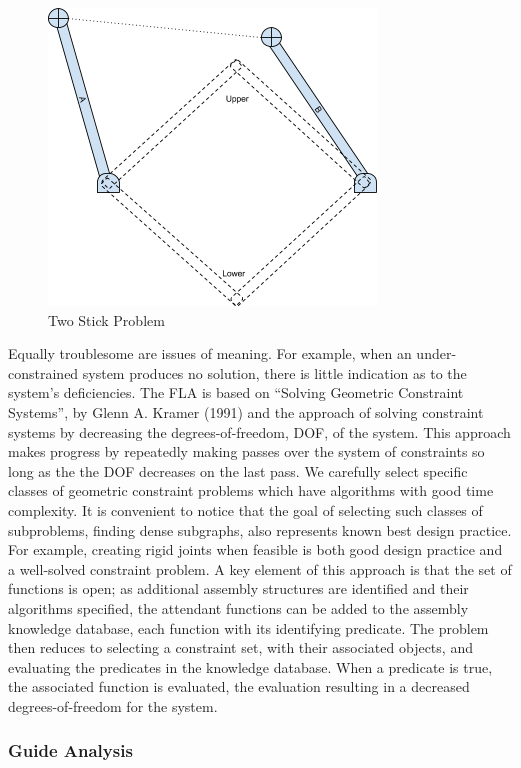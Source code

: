 \documentclass[]{report}
\begin{document}
\begin{figure}[h!]
	\centering
	\includegraphics[scale=0.7]{images/image04.png}
	\caption{Two Stick Problem}
	\label{fig:two-stick-problem}
\end{figure}

Equally troublesome are issues of meaning. 
For example, when an under-constrained system produces no solution, 
there is little indication as to the system’s deficiencies.
The FLA is based on “Solving Geometric Constraint Systems”, 
by Glenn A. Kramer (1991) and the approach of solving constraint 
systems by decreasing the degrees-of-freedom, DOF, of the system.  
This approach makes progress by repeatedly making passes over the 
system of constraints so long as the the DOF decreases on the last pass. 
We carefully select specific classes of geometric constraint problems 
which have algorithms with good time complexity. 
It is convenient to notice that the  goal of selecting such 
classes of subproblems, finding dense subgraphs, also represents known best design practice. 
For example, creating rigid joints when feasible is both good design practice 
and a well-solved constraint problem. A key element of this approach 
is that the set of functions is open; 
as additional assembly structures are identified and their 
algorithms specified, the attendant functions can be added 
to the assembly knowledge database, each function with its identifying predicate. 
The problem then reduces to selecting a constraint set, 
with their associated objects, and evaluating the predicates in the knowledge database. 
When a predicate is true, the associated function is evaluated, 
the evaluation resulting in a decreased degrees-of-freedom for the system.  

\subsubsection{Guide Analysis}
\end{document}
